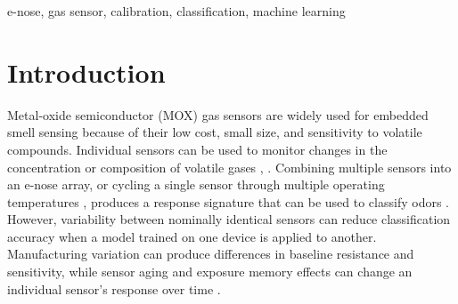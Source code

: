 \documentclass[conference]{IEEEtran}
\begin{document}
\begin{abstract}
    Variability between nominally identical metal-oxide semiconductor (MOX) gas sensors limits the transfer of odor classification models between devices. This work investigates unsupervised domain adaptation for temperature-modulated MOX sensors using unlabeled exposure data, without requiring measurements under known reference conditions. We collected over 26,000 measurement cycles from eight sensors exposed simultaneously to 37 substances spanning nuts, herbs, and spices, with two sensors assigned to each of four heater profiles. Using linear discriminant analysis, we evaluate classification transfer between paired sensors and compare compensation methods ranging from scalar mean subtraction to full covariance alignment. With log-resistance and log-vapor-pressure features, per-heater-step mean compensation increases mean target balanced accuracy from 47.0\% to 68.4\% across eight transfer directions, while CORAL-style covariance alignment achieves 71.2\%. Including vapor pressure improves performance under every compensation method. Per-step mean compensation retains most of its full-coverage performance when adaptation statistics are estimated from only five substances, and transfer improvements extend to substances excluded from adaptation. These results indicate that per-heater-step offsets account for much of the sensor mismatch under shared exposure conditions, allowing simple adjustments estimated from unlabeled measurements to substantially improve model transfer.
\end{abstract}

\begin{IEEEkeywords}
    e-nose, gas sensor, calibration, classification, machine learning
\end{IEEEkeywords}

\section{Introduction}
Metal-oxide semiconductor (MOX) gas sensors are widely used for embedded smell sensing because of their low cost, small size, and sensitivity to volatile compounds. 
Individual sensors can be used to monitor changes in the concentration or composition of volatile gases \cite{verzeroli2025MoxOutdoor}, \cite{laska2025spoilage}.
Combining multiple sensors into an e-nose array, or cycling a single sensor through multiple operating temperatures \cite{lee1999TemperatureModulation}, produces a response signature that can be used to classify odors \cite{hussain2023DLGasClassify}. However, variability between nominally identical sensors can reduce classification accuracy when a model trained on one device is applied to another. Manufacturing variation can produce differences in baseline resistance and sensitivity, while sensor aging and exposure memory effects can change an individual sensor’s response over time \cite{panzardi2025bme688,dennler2022drift}.
\end{document}
